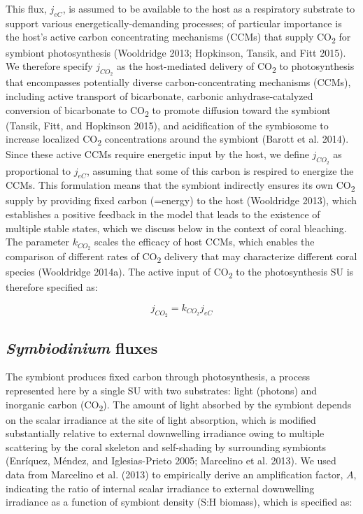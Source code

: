 \documentclass[]{elsarticle} %
\begin{document}
This flux, \(j_{eC}\), is assumed to be available to the host as a
respiratory substrate to support various energetically-demanding
processes; of particular importance is the host's active carbon
concentrating mechanisms (CCMs) that supply CO\textsubscript{2} for
symbiont photosynthesis (Wooldridge 2013; Hopkinson, Tansik, and Fitt
2015). We therefore specify \(j_{CO_2}\) as the host-mediated delivery
of CO\textsubscript{2} to photosynthesis that encompasses potentially
diverse carbon-concentrating mechanisms (CCMs), including active
transport of bicarbonate, carbonic anhydrase-catalyzed conversion of
bicarbonate to CO\textsubscript{2} to promote diffusion toward the
symbiont (Tansik, Fitt, and Hopkinson 2015), and acidification of the
symbiosome to increase localized CO\textsubscript{2} concentrations
around the symbiont (Barott et al. 2014). Since these active CCMs
require energetic input by the host, we define \(j_{CO_2}\) as
proportional to \(j_{eC}\), assuming that some of this carbon is
respired to energize the CCMs. This formulation means that the symbiont
indirectly ensures its own CO\textsubscript{2} supply by providing fixed
carbon (=energy) to the host (Wooldridge 2013), which establishes a
positive feedback in the model that leads to the existence of multiple
stable states, which we discuss below in the context of coral bleaching.
The parameter \(k_{CO_2}\) scales the efficacy of host CCMs, which
enables the comparison of different rates of CO\textsubscript{2}
delivery that may characterize different coral species (Wooldridge
2014a). The active input of CO\textsubscript{2} to the photosynthesis SU
is therefore specified as:

\begin{equation} j_{CO_2} = k_{CO_2}j_{eC} \end{equation}

\subsection{\texorpdfstring{\emph{Symbiodinium}
fluxes}{Symbiodinium fluxes}}\label{symbiodinium-fluxes}

The symbiont produces fixed carbon through photosynthesis, a process
represented here by a single SU with two substrates: light (photons) and
inorganic carbon (CO\textsubscript{2}). The amount of light absorbed by
the symbiont depends on the scalar irradiance at the site of light
absorption, which is modified substantially relative to external
downwelling irradiance owing to multiple scattering by the coral
skeleton and self-shading by surrounding symbionts (Enríquez, Méndez,
and Iglesias-Prieto 2005; Marcelino et al. 2013). We used data from
Marcelino et al. (2013) to empirically derive an amplification factor,
\(A\), indicating the ratio of internal scalar irradiance to external
downwelling irradiance as a function of symbiont density (S:H biomass),
which is specified as:
\end{document}
